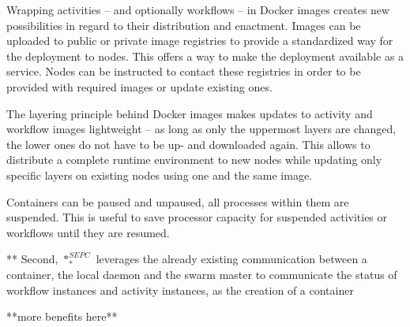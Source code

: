     Wrapping activities -- and optionally workflows -- in Docker images creates new possibilities in regard to their distribution and enactment. Images can be uploaded to public or private image registries to provide a standardized way for the deployment to nodes. This offers a way to make the deployment available as a service. Nodes can be instructed to contact these registries in order to be provided with required images or update existing ones.

    The layering principle behind Docker images makes updates to activity and workflow images lightweight -- as long as only the uppermost layers are changed, the lower ones do not have to be up- and downloaded again. This allows to distribute a complete runtime environment to new nodes while updating only specific layers on existing nodes using one and the same image.

    Containers can be paused and unpaused, \ie all processes within them are suspended. This is useful to save processor capacity for suspended activities or workflows until they are resumed.

    ** Second, $*_{*}^{SEPC}$ leverages the already existing communication between a container, the local daemon and the swarm master to communicate the status of workflow instances and activity instances, as the creation of a container

    **more benefits here**


